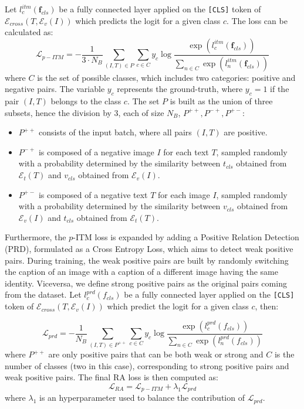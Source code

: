 \documentclass[acmsmall]{acmart}
\begin{document}
Let $l^{itm}_c(\mathbf{f}_{cls})$ be a fully connected layer applied on the \texttt{[CLS]} token of $\mathcal{E}_{cross}(T,\mathcal{E}_v(I))$ which predicts the logit for a given class $c$. The loss can be calculated as:
\begin{equation}
    \mathcal{L}_{p-ITM}=-\frac{1}{3\cdot N_B}\sum_{(I, T)\in P}\sum_{c\in C}y_c\log\frac{\exp(l^{itm}_c(\mathbf{f}_{cls}))}{\sum_{n\in C}\exp(l^{itm}_n(\mathbf{f}_{cls}))}
    \label{eq:lpitm}
\end{equation}
where $C$ is the set of possible classes, which includes two categories: positive and negative pairs. The variable $y_c$ represents the ground-truth, where $y_c=1$ if the pair $(I, T)$ belongs to the class $c$. The set $P$ is built as the union of three subsets, hence the division by 3, each of size $N_B$, $P^{++},P^{-+},P^{+-}$:
\begin{itemize}
    \item \( P^{++} \) consists of the input batch, where all pairs \((I, T)\) are positive.
    \item \( P^{-+} \) is composed of a negative image \( I \) for each text \( T \), sampled randomly with a probability determined by the similarity between $t_{cls}$ obtained from $\mathcal{E}_{t}(T)$ and $v_{cls}$ obtained from $\mathcal{E}_v(I)$.
    \item \( P^{+-} \) is composed of a negative text \( T \) for each image \( I \), sampled randomly with a probability determined by the similarity between $v_{cls}$ obtained from $\mathcal{E}_{v}(I)$ and $t_{cls}$ obtained from $\mathcal{E}_t(T)$.
\end{itemize}

\noindent
Furthermore, the $p$-ITM loss is expanded by adding a Positive Relation Detection (PRD), formulated as a Cross Entropy Loss, which aims to detect weak positive pairs. During training, the weak positive pairs are built by randomly switching the caption of an image with a caption of a different image having the same identity. Viceversa, we define strong positive pairs as the original pairs coming from the dataset. Let $l^{prd}_c(f_{cls})$ be a fully connected layer applied on the \texttt{[CLS]} token of $\mathcal{E}_{cross}(T,\mathcal{E}_v(I))$ which predict the logit for a given class $c$, then:

\begin{equation}
        \mathcal{L}_{prd}=-\frac{1}{N_B}\sum_{(I, T)\in P^{++}}\sum_{c\in C}y_c\log\frac{\exp(l^{prd}_c(f_{cls}))}{\sum_{n\in C}\exp(l^{prd}_n(f_{cls}))}
\end{equation}
where $P^{++}$ are only positive pairs that can be both weak or strong and $C$ is the number of classes (two in this case), corresponding to strong positive pairs and weak positive pairs. The final RA loss is then computed as:
\begin{equation}
    \mathcal{L}_{RA}=\mathcal{L}_{p-ITM}+\lambda_1\mathcal{L}_{prd}
\end{equation}
\noindent where $\lambda_1$ is an hyperparameter used to balance the contribution of $\mathcal{L}_{prd}$.
\end{document}
